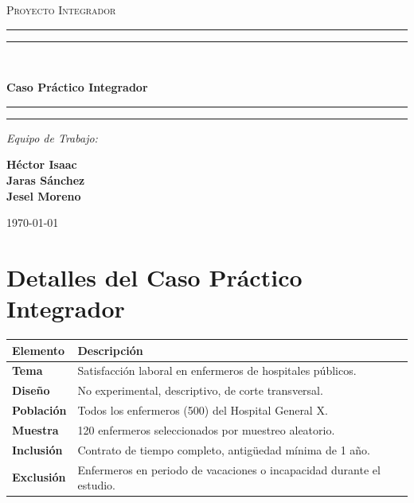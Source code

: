 \documentclass[12pt,a4paper]{article}
\begin{document}
\begin{titlepage}
    \centering
    \vspace*{2cm}
    
    {\scshape\LARGE Proyecto Integrador \par}
    \vspace{1.5cm}
    
    \rule{\textwidth}{0.4pt}\vspace*{-\baselineskip}\vspace{3.2pt}
    \rule{\textwidth}{1.6pt}\\[\baselineskip]
    {\huge \bfseries Caso Práctico Integrador \par}
    \vspace{0.2cm}
    \rule{\textwidth}{1.6pt}\vspace*{-\baselineskip}\vspace{3.2pt}
    \rule{\textwidth}{0.4pt}
    
    \vspace{2cm}
    
    {\Large\itshape Equipo de Trabajo:\par}
    \vspace{0.8cm}
    {\Large 
        \textbf{Héctor Isaac}\\[0.4cm]
        \textbf{Jaras Sánchez}\\[0.4cm]
        \textbf{Jesel Moreno}
    \par}
    \vfill
    
    {\large \today\par}
\end{titlepage}

\newpage

\section*{Detalles del Caso Práctico Integrador}
\vspace{0.5cm}

\begin{table}[h!]
    \centering
    \renewcommand{\arraystretch}{1.8} %
    \begin{tabularx}{\textwidth}{>{\bfseries}l X}
        \toprule
        Elemento & Descripción \\
        \midrule
        Tema & Satisfacción laboral en enfermeros de hospitales públicos. \\
        Diseño & No experimental, descriptivo, de corte transversal. \\
        Población & Todos los enfermeros (500) del Hospital General X. \\
        Muestra & 120 enfermeros seleccionados por muestreo aleatorio. \\
        Inclusión & Contrato de tiempo completo, antigüedad mínima de 1 año. \\
        Exclusión & Enfermeros en periodo de vacaciones o incapacidad durante el estudio. \\
        \bottomrule
    \end{tabularx}
\end{table}
\end{document}
